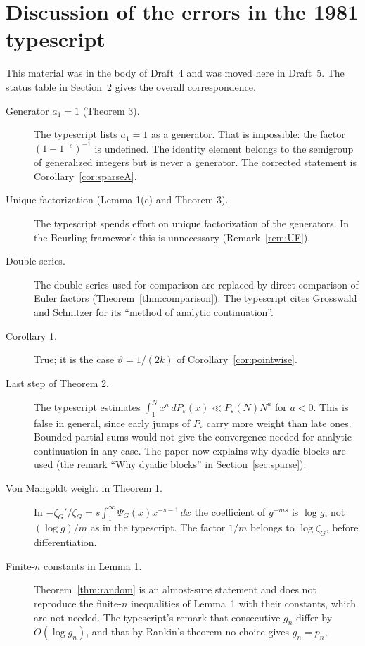 \documentclass[12pt,letterpaper]{article}
\begin{document}
\section{Discussion of the errors in the 1981 typescript}\label{sec:errors}
This material was in the body of Draft~4 and was moved here in Draft~5.
The status table in Section~2 gives the overall correspondence.
\begin{description}
\item[Generator $a_1=1$ (Theorem 3).]  The typescript lists $a_1=1$ as a
  generator.  That is impossible: the factor $(1-1^{-s})^{-1}$ is
  undefined.  The identity element belongs to the semigroup of
  generalized integers but is never a generator.  The corrected statement
  is Corollary~\ref{cor:sparseA}.
\item[Unique factorization (Lemma 1(c) and Theorem 3).]  The typescript
  spends effort on unique factorization of the generators.  In the
  Beurling framework this is unnecessary (Remark~\ref{rem:UF}).
\item[Double series.]  The double series
  used for comparison are replaced by direct comparison of Euler factors
  (Theorem~\ref{thm:comparison}).  The typescript cites Grosswald and
  Schnitzer for its ``method of analytic continuation''.
\item[Corollary 1.]  True; it is the case $\vartheta=1/(2k)$ of
  Corollary~\ref{cor:pointwise}.
\item[Last step of Theorem 2.]  The typescript estimates
  $\int_1^Nx^a\,dP_\varepsilon(x)\ll P_\varepsilon(N)N^a$ for $a<0$.  This
  is false in general, since early jumps of $P_\varepsilon$ carry more
  weight than late ones.  Bounded partial sums would not give the
  convergence needed for analytic continuation in any case.  The paper
  now explains why dyadic blocks are used (the remark ``Why dyadic
  blocks'' in Section~\ref{sec:sparse}).
\item[Von Mangoldt weight in Theorem 1.]  In
  $-\zeta_G'/\zeta_G=s\int_1^\infty\Psi_G(x)x^{-s-1}\,dx$ the coefficient
  of $g^{-ms}$ is $\log g$, not $(\log g)/m$ as in the typescript.  The
  factor $1/m$ belongs to $\log\zeta_G$, before differentiation.
\item[Finite-$n$ constants in Lemma 1.]  Theorem~\ref{thm:random} is an
  almost-sure statement and does not reproduce the finite-$n$
  inequalities of Lemma~1 with their constants, which are not needed.
  The typescript's remark that consecutive $g_n$ differ by
  $O(\log g_n)$, and that by Rankin's theorem no choice gives $g_n=p_n$,

\end{description}
\end{document}
